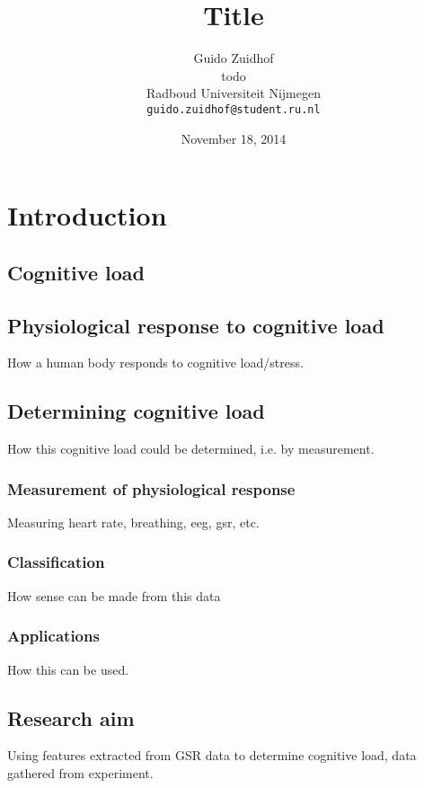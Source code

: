 \documentclass[12pt,fleqn,leqno,letterpaper]{article}
\title{Title}
\author{Guido Zuidhof\\
  \small{ todo }\\
  \small{Radboud Universiteit Nijmegen}\\
  \small{\texttt{guido.zuidhof@student.ru.nl}}
}
\date{November 18, 2014}
\begin{document}
\maketitle



\begin{abstract}
\end{abstract}

\section{Introduction}
\subsection{Cognitive load}

\subsection{Physiological response to cognitive load}
How a human body responds to cognitive load/stress. 

\subsection{Determining cognitive load}
How this cognitive load could be determined, i.e. by measurement.

\subsubsection{Measurement of physiological response}
Measuring heart rate, breathing, eeg, gsr, etc.

\subsubsection{Classification}
How sense can be made from this data

\subsubsection{Applications}
How this can be used.

\subsection{Research aim}
Using features extracted from GSR data to determine cognitive load, data gathered from experiment.
\end{document}
